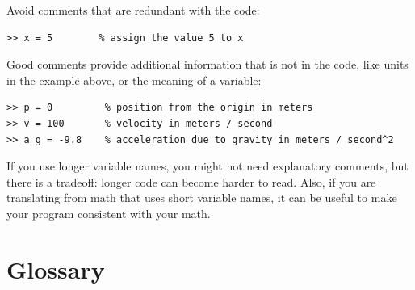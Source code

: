 \documentclass[
]{book}
\begin{document}
Avoid comments that are redundant with the code:

\begin{verbatim}
>> x = 5        % assign the value 5 to x
\end{verbatim}

Good comments provide additional information that is not in the
code, like units in the example above, or the meaning of a variable:

\begin{verbatim}
>> p = 0         % position from the origin in meters
>> v = 100       % velocity in meters / second
>> a_g = -9.8    % acceleration due to gravity in meters / second^2
\end{verbatim}

If you use longer variable names, you might not need explanatory
comments, but there is a tradeoff: longer code can become harder
to read.  Also, if you are translating from math
that uses short variable names, it can be useful to make your
program consistent with your math.


\section{Glossary}
\end{document}

